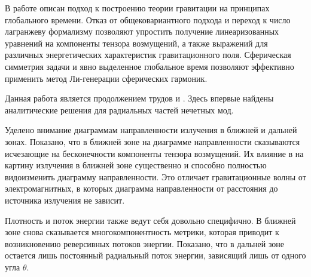 \documentclass[\docroot/reports/draft/report.tex]{subfiles}
\begin{document}
\onlyinsubfile{\tableofcontents}

В работе описан подход к построению теории гравитации на принципах глобального времени. Отказ от общековариантного подхода и переход к число лагранжеву формализму позволяют упростить получение линеаризованных уравнений на компоненты тензора возмущений, а также выражений для различных энергетических характеристик гравитационного поля. Сферическая симметрия задачи и явно выделенное глобальное время позволяют эффективно применить метод Ли-генерации сферических гармоник.

Данная работа является продолжением трудов  и . Здесь впервые найдены аналитические решения для радиальных частей нечетных мод.

Уделено внимание диаграммам направленности излучения в ближней и дальней зонах. Показано, что в ближней зоне на диаграмме направленности сказываются исчезающие на бесконечности компоненты тензора возмущений. Их влияние в на картину излучения в ближней зоне существенно и способно полностью видоизменить диаграмму направленности. Это отличает гравитационные волны от электромагнитных, в которых диаграмма направленности от расстояния до источника излучения не зависит.

Плотность и поток энергии также ведут себя довольно специфично. В ближней зоне снова сказывается многокомпонентность метрики, которая приводит к возникновению реверсивных потоков энергии. Показано, что в дальней зоне остается лишь постоянный радиальный поток энергии, зависящий лишь от одного угла $\theta$.
\end{document}
